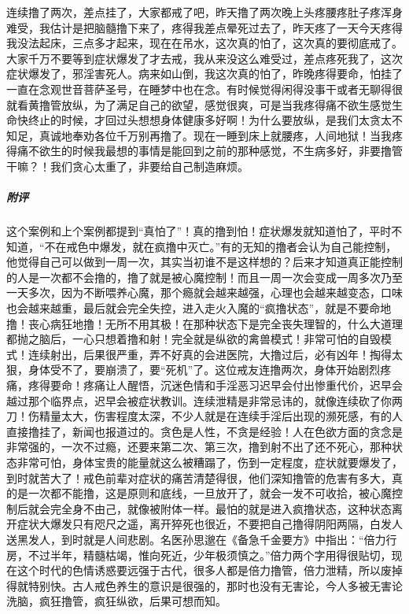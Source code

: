 \begin{case}
    连续撸了两次，差点挂了，大家都戒了吧，昨天撸了两次晚上头疼腰疼肚子疼浑身难受，我估计是把脑髓撸下来了，疼得我差点晕死过去了，昨天疼了一天今天疼得我没法起床，三点多才起来，现在在吊水，这次真的怕了，这次真的要彻底戒了。大家千万不要等到症状爆发了才去戒，我从来没这么难受过，差点疼死我了，这次症状爆发了，邪淫害死人。病来如山倒，我这次真的怕了，昨晚疼得要命，怕挂了一直在念观世音菩萨圣号，在睡梦中也在念。有时候觉得闲得没事干或者无聊得很就看黄撸管放纵，为了满足自己的欲望，感觉很爽，可是当我疼得痛不欲生感觉生命快终止的时候，才回过头想想身体健康多好啊！为什么要放纵，是我们太贪太不知足，真诚地奉劝各位千万别再撸了。现在一睡到床上就腰疼，人间地狱！当我疼得痛不欲生的时候我最想的事情是能回到之前的那种感觉，不生病多好，非要撸管干嘛？！我们贪心太重了，非要给自己制造麻烦。
    \subparagraph{附评} 这个案例和上个案例都提到“真怕了”！真的撸到怕！症状爆发就知道怕了，平时不知道，“不在戒色中爆发，就在疯撸中灭亡。”有的无知的撸者会认为自己能控制，他觉得自己可以做到一周一次，其实当初谁不是这样想的？后来才知道真正能控制的人是一次都不会撸的，撸了就是被心魔控制！而且一周一次会变成一周多次乃至一天多次，因为不断喂养心魔，那个瘾就会越来越强，心理也会越来越变态，口味也会越来越重，最后就会完全失控，进入走火入魔的“疯撸状态”，就是不要命地撸！丧心病狂地撸！无所不用其极！在那种状态下是完全丧失理智的，什么大道理都抛之脑后，一心只想着撸和射！完全就是纵欲的禽兽模式！非常可怕的自毁模式！连续射出，后果很严重，弄不好真的会进医院，大撸过后，必有凶年！掏得太狠，身体受不了，要崩溃了，要“死机”了。这位戒友连撸两次，身体开始剧烈疼痛，疼得要命！疼痛让人醒悟，沉迷色情和手淫恶习迟早会付出惨重代价，迟早会越过那个临界点，迟早会被症状教训。连续泄精是非常忌讳的，就像连续砍了你两刀！伤精量太大，伤害程度太深，不少人就是在连续手淫后出现的濒死感，有的人直接撸挂了，新闻也报道过的。贪色是人性，不贪是经验！人在色欲方面的贪念是非常强的，一次不过瘾，还要来第二次、第三次，撸到射不出了还不死心，那种状态非常可怕，身体宝贵的能量就这么被糟蹋了，伤到一定程度，症状就要爆发了，到时就苦大了！戒色前辈对症状的痛苦清楚得很，他们深知撸管的危害有多大，真的是一次都不能撸，这是原则和底线，一旦放开了，就会一发不可收拾，被心魔控制后就会完全身不由己，就像被附体一样。最怕的就是进入疯撸状态，这种状态离开症状大爆发只有咫尺之遥，离开猝死也很近，不要把自己撸得阴阳两隔，白发人送黑发人，到时就是人间悲剧。名医孙思邈在《备急千金要方》中指出：“倍力行房，不过半年，精髓枯竭，惟向死近，少年极须慎之。”倍力两个字用得很贴切，现在这个时代的色情诱惑要远强于古代，很多人都是倍力撸管，倍力泄精，所以废掉得就特别快。古人戒色养生的意识是很强的，那时也没有无害论，今人多被无害论洗脑，疯狂撸管，疯狂纵欲，后果可想而知。
\end{case}

